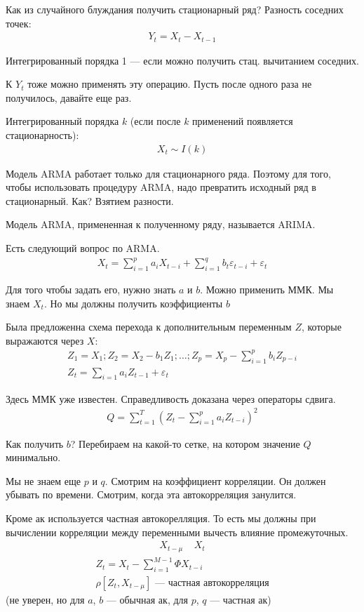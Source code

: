 \documentclass{book}
\begin{document}
Как из случайного блуждания получить стационарный ряд? Разность соседних точек:
\begin{gather*}
  Y_t=X_t-X_{t-1}
\end{gather*}

Интегрированный порядка 1 --- если можно получить стац. вычитанием соседних.

К $Y_t$ тоже можно применять эту операцию. Пусть после одного раза не получилось, давайте еще раз.

Интегрированный порядка $k$ (если после $k$ применений появляется стационарность):
\begin{gather*}
  X_t \sim I(k)
\end{gather*}

Модель ARMA работает только для стационарного ряда. Поэтому для того, чтобы использовать процедуру ARMA, надо превратить исходный ряд в стационарный. Как? Взятием разности.

Модель ARMA, примененная к полученному ряду, называется ARIMA.

Есть следующий вопрос по ARMA.
\begin{gather*}
  X_t=\sum_{i=1}^{p} {a_iX_{t-i}}+\sum_{i=1}^{q} {b_t\varepsilon_{t-i}}+\varepsilon_t
\end{gather*}

Для того чтобы задать его, нужно знать $a$ и $b$. Можно применить ММК. Мы знаем  $X_t$. Но мы должны получить коэффициенты  $b$

Была предложенна схема перехода к дополнительным переменным  $Z$, которые выражаются через  $X$:
\begin{gather*}
  Z_1=X_1; Z_2=X_2-b_1 Z_1; \dots; Z_p=X_{p}-\sum_{i=1}^{p} {b_i Z_{p-i}}\\
  Z_t=\sum_{i=1}^{} {a_iZ_{t-1}+\varepsilon_t}
\end{gather*}

Здесь ММК уже известен. Справедливость доказана через операторы сдвига.
\begin{gather*}
  Q=\sum_{t=1}^{T} {\left(Z_t-\sum_{i=1}^{p} {a_iZ_{t-i}}\right)^2}
\end{gather*}


Как получить $b$? Перебираем на какой-то сетке, на котором значение $Q$ минимально.

Мы не знаем еще $p$ и $q$. Смотрим на коэффициент корреляции. Он должен убывать по времени. Смотрим, когда эта автокорреляция занулится.

Кроме ак используется частная автокорелляция. То есть мы должны при вычислении корреляции между переменными вычесть влияние промежуточных.
\begin{gather*}
  X_{t-\mu}~~~~~X_t
\end{gather*}
\begin{gather*}
  Z_t=X_t-\sum_{i=1}^{M-1} {\Phi X_{t-i}}\\
  \rho\left[Z_t, X_{t-\mu}\right]\textrm{ --- частная автокорреляция}
\end{gather*}
(не уверен, но для $a$, $b$ --- обычная ак, для $p$, $q$ --- частная ак)
\end{document}
